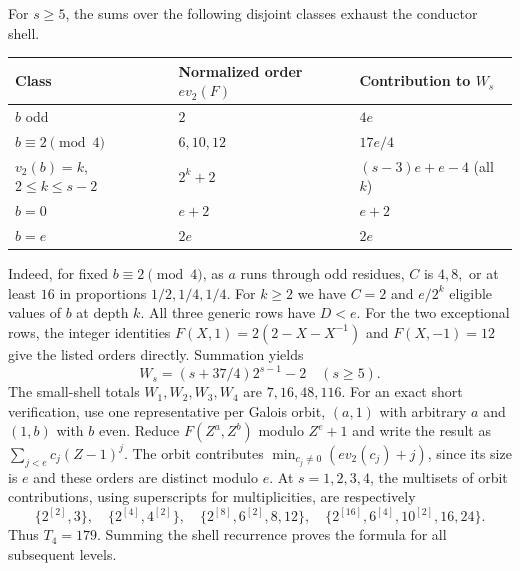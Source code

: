 For $s\ge5$, the sums over the following disjoint classes exhaust the conductor shell.
\begin{center}
\begin{tabular}{lll}
\hline
Class & Normalized order $ev_2(F)$ & Contribution to $W_s$\\
\hline
$b$ odd & $2$ & $4e$\\
$b\equiv2\pmod4$ & $6,10,12$ & $17e/4$\\
$v_2(b)=k$, $2\le k\le s-2$ & $2^k+2$ & $(s-3)e+e-4$ (all $k$)\\
$b=0$ & $e+2$ & $e+2$\\
$b=e$ & $2e$ & $2e$\\
\hline
\end{tabular}
\end{center}
Indeed, for fixed $b\equiv2\pmod4$, as $a$ runs through odd residues, $C$ is $4,8,$ or at least $16$ in proportions $1/2,1/4,1/4$. For $k\ge2$ we have $C=2$ and $e/2^k$ eligible values of $b$ at depth $k$. All three generic rows have $D<e$. For the two exceptional rows, the integer identities $F(X,1)=2(2-X-X^{-1})$ and $F(X,-1)=12$ give the listed orders directly. Summation yields
\[
 W_s=(s+37/4)2^{s-1}-2\quad(s\ge5).
\]
The small-shell totals $W_1,W_2,W_3,W_4$ are $7,16,48,116$. For an exact short verification, use one representative per Galois orbit, $(a,1)$ with arbitrary $a$ and $(1,b)$ with $b$ even. Reduce $F(Z^a,Z^b)$ modulo $Z^e+1$ and write the result as $\sum_{j<e}c_j(Z-1)^j$. The orbit contributes $\min_{c_j\ne0}(ev_2(c_j)+j)$, since its size is $e$ and these orders are distinct modulo $e$. At $s=1,2,3,4$, the multisets of orbit contributions, using superscripts for multiplicities, are respectively
\[
 \{2^{[2]},3\},\quad \{2^{[4]},4^{[2]}\},\quad
 \{2^{[8]},6^{[2]},8,12\},\quad
 \{2^{[16]},6^{[4]},10^{[2]},16,24\}.
\]
Thus $T_4=179$. Summing the shell recurrence proves the formula for all subsequent levels.
